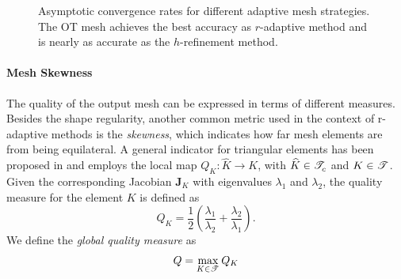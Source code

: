 \documentclass[a4paper,11pt]{article}
\begin{document}
\begin{figure}[h!]\label{tikz:comparison-rate}
\centering
{}
\caption{Asymptotic convergence rates for different adaptive mesh strategies. The  OT mesh achieves the best accuracy as $r$-adaptive method and is nearly as accurate as the $h$-refinement method.}
\end{figure}



\paragraph{Mesh Skewness}
\label{sec:skewness}
The quality of the output mesh can be expressed in terms of different measures. Besides the shape regularity, another common metric used in the context of r-adaptive methods is the \textit{skewness}, which indicates
how far mesh elements are from being equilateral. A general indicator for triangular elements has been proposed in \cite{BHR:2009} and employs the local map $Q_{K}: \widehat{K}
\rightarrow K$, with $\widehat{K} \in \mathscr T^{}_{c}$ and $K \in
\mathscr T^{}$. Given the corresponding Jacobian $\pmb{J}_{K}$ with eigenvalues
$\lambda_{1}$ and $\lambda_{2}$, the quality measure for the element
$K$ is defined as
\begin{equation}
  Q_{K}
  =
  \frac{1}{2} \left( \frac{\lambda_{1}}{\lambda_{2}}
  +
  \frac{\lambda_{2}}{\lambda_{1}}  \right).
  \label{eq:local skewness}
\end{equation}
We define the \emph{global quality measure} as
\begin{equation}
  Q = \max_{K \in \mathscr T^{}}
  Q_{K}
\end{equation}
\end{document}
